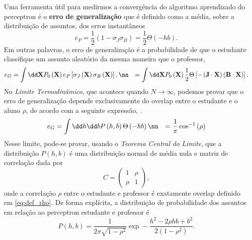 Uma ferramenta útil para medirmos a convergência do algoritmo
aprendizado do perceptron é o \textbf{erro de generalização}
 que é definido como a média, sobre a
distribuição de assuntos, dos erros instantâneos
\[
 e_P = \frac{1}{2}\left(
1 - \sigma_J\sigma_B \right)= \frac{1}{2}\Theta\left(-hb\right). 
\]
Em outras palavras, o erro de generalização é a probabilidade de que o
estudante classifique um assunto aleatório da mesma maneira que o professor,
\begin{align}
    e_G 
    &= 
    \int\dd\mathbf{X} P_0\left( \mathbf{X} \right) e_P 
    \left[ 
        \sigma_J\left( \mathbf{X} \right) \sigma_B \left( \mathbf{X} \right)
    \right],
    \nn
    &= 
    \int \dd \mathbf{X} P_0\left( \mathbf{X} \right) \frac{1}{2}
    \Theta\left[ -\left(\mathbf{J}\cdot\mathbf{X}\right)
    \left( \mathbf{B}\cdot\mathbf{X}\right) \right].
    \label{eq:erro_X}
\end{align}
No \textit{Limite Termodinâmico}, que acontece quando $N \rightarrow \infty$,
podemos provar que o erro de generalização depende exclusivamente do overlap
entre o estudante e o aluno  $\rho$, de acordo com a seguinte expressão,
 \cite{Engel2004}.
\begin{align}
    e_G 
    &= \int \dd h \dd b P \left(h,b\right) \Theta \left( -hb \right)\nn 
    &= \frac{1}{\pi}\cos^{-1}\left( \rho \right) 
    \label{eq:rho_cos}
\end{align}
Nesse limite, pode-se provar, usando o \textit{Teorema Central
do Limite}, que a distribuição $P\left(h,b\right)$ é uma distribuição
normal de média nula e matriz de correlação dada por
\begin{equation}
  C = \left( 
  \begin{array}{cc} 
    1 & \rho \\
    \rho & 1
  \end{array}
  \right),
\end{equation}
onde a correlação $\rho$ entre o estudante e professor é exatamente
overlap definido em \eqref{eq:def_rho}. De forma explícita,
a distribuição de probabilidade dos assuntos em relação ao perceptron
estudante e professor é
\begin{equation}
  P\left(h,b\right) = \frac{1}{2\pi\sqrt{1 - \rho^2}}
  \exp  -\frac{ h^2 - 2 \rho h b + b^2 }{ 2\left( 1 -\rho^2 \right) }.
\end{equation}

